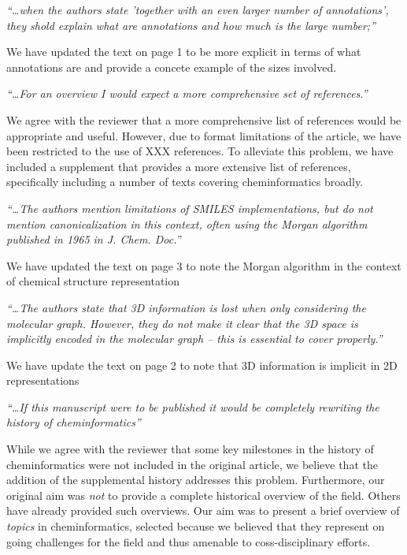 \documentclass[11pt,a4paper]{article}
\begin{document}
\newcommand{\comment}[1]{\textit{``\ldots #1''}\par\vspace{0.5em}}
\newcommand{\response}[1]{#1\vspace{1em}}


\comment{when the authors state 'together with an even larger number
  of annotations', they shold explain what are annotations and how
  much is the large number;} 
\response{We have updated the text on page 1 to be more explicit in
  terms of what annotations are and provide a concete example of the
  sizes involved.}

\comment{For an overview I would expect a more comprehensive set of
  references.}
\response{We agree with the reviewer that a more comprehensive list of
references would be appropriate and useful. However, due to format
limitations of the article, we have been restricted to the use of XXX
references. To alleviate this problem, we have included a supplement
that provides a more extensive list of references, specifically
including a number of texts covering cheminformatics broadly.}


\comment{The authors mention limitations of SMILES implementations,
  but do not mention canonicalization in this context, often using the
  Morgan algorithm published in 1965 in J. Chem. Doc.}
\response{We have updated the text on page 3 to note the Morgan
  algorithm in the context of chemical structure representation}

\comment{The authors state that 3D information is lost when only
  considering the molecular graph. However, they do not make it clear
  that the 3D space is implicitly encoded in the molecular graph –
  this is essential to cover properly.}
\response{We have update the text on page 2 to note that 3D
  information is implicit in 2D representations}

\comment{If this manuscript were to be published it would be
  completely rewriting the history of cheminformatics}
\response{While we agree with the reviewer that some key milestones in
  the history of cheminformatics were not included in the original
  article, we believe that the addition of the supplemental history
  addresses this problem. Furthermore, our original aim was \emph{not}
  to provide a complete historical overview of the field. Others have
  already provided such overviews. Our aim was to present a brief
  overview of \emph{topics} in cheminformatics, selected because we
  believed that they represent on going challenges for the field and
  thus amenable to coss-disciplinary efforts.}
\end{document}
